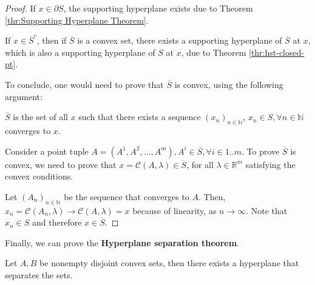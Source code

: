 \begin{proof}
  If \( x \in \partial S \), the supporting hyperplane exists due to Theorem
  \ref{thr:Supporting Hyperplane Theorem}.

  If \( x \in \overline{S}^{c} \), then if \(\overline{S} \) is a convex set,
  there exists a supporting hyperplane of \( \overline{S} \) at \( x \), which
  is also a supporting hyperplane of \( S \) at \( x \), due to Theorem
  \ref{thr:hst-closed-pt}.

  To conclude, one would need to prove that \( \overline{S} \) is convex, using
  the following argument:

    \( \overline{S} \) is the set of all \( x \) such that there exists a
    sequence \( (x_{n})_{n \in \mathbb{N}} \), \( x_{n} \in S, \forall n \in
    \mathbb{N} \) converges to \( x \).

    Consider a point tuple \( A = (A^{1}, A^{2}, \ldots , A^{m}), A^{i} \in
    \overline{S}, \forall i \in 1..m \). To prove \( \overline{S}
    \) is convex, we need to prove that \( x = \mathcal{C}(A, \lambda) \in
    \overline{S} \), for
    all \( \lambda \in \mathbb{R}^{m} \) satisfying the convex conditions.

    Let \( (A_{n})_{n \in \mathbb{N}} \) be the sequence that converges to \( A
    \). Then, \( x_{n} = \mathcal{C}(A_{n}, \lambda) \to  \mathcal{C}(A, \lambda) =
    x\) because of linearity, as \( n \to  \infty \). Note that \( x_{n} \in S
    \) and therefore \( x \in \overline{S} \).
\end{proof}

Finally, we can prove the \textbf{Hyperplane separation theorem}.
\begin{theorem}
\label{thr:Hyperplane Separation Theorem}
  Let \( A, B \) be nonempty disjoint convex sets, then there exists a
  hyperplane that separates the sets.
\end{theorem}

